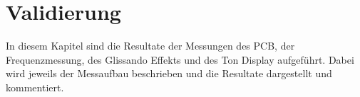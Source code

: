 \clearpage
\section{Validierung}\label{sec:Validierung}
In diesem Kapitel sind die Resultate der Messungen des PCB, der Frequenzmessung, des Glissando Effekts und des Ton Display aufgeführt. Dabei wird jeweils der Messaufbau beschrieben und die Resultate dargestellt und kommentiert. 